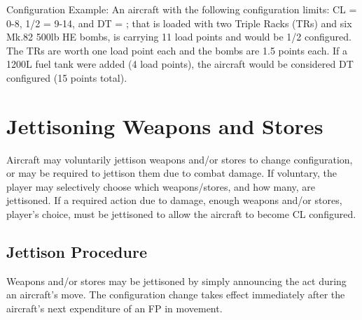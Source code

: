 \begin{advancedrules}
    Configuration Example: An aircraft with the following configuration limits: CL = 0-8, 1/2 = 9-14, and DT = ; that is loaded with two Triple Racks (TRs) and six Mk.82 500lb HE bombs, is carrying 11 load points and would be 1/2 configured. The TRs are worth one load point each and the bombs are 1.5 points each. If a 1200L fuel tank were added (4 load points), the aircraft would be considered DT configured (15 points total).

    \section{Jettisoning Weapons and Stores}
    \label{rules:jettisoning-stores}

    Aircraft may voluntarily jettison weapons and/or stores to change configuration, or may be required to jettison them due to combat damage. If voluntary, the player may selectively choose which weapons/stores, and how many, are jettisoned. If a required action due to damage, enough weapons and/or stores, player's choice, must be jettisoned to allow the aircraft to become CL configured.

    \subsection{Jettison Procedure}
    Weapons and/or stores may be jettisoned by simply announcing the act during an aircraft's move. The configuration change takes effect immediately after the aircraft's next expenditure of an FP in movement.

\end{advancedrules}
